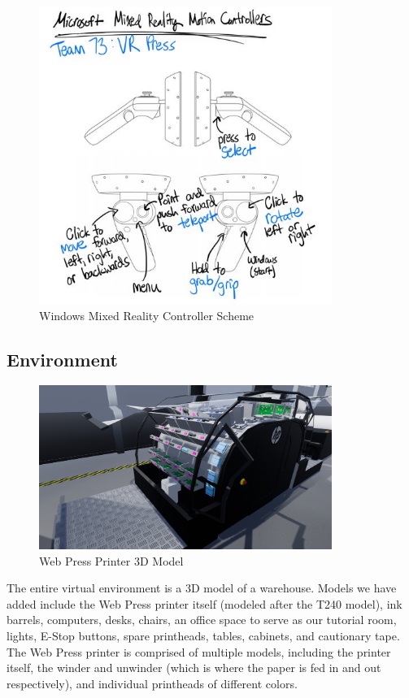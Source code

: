 \documentclass[onecolumn, draftclsnofoot,10pt, compsoc]{IEEEtran}
\begin{document}
\begin{figure}[ht!]
    \centering
    \includegraphics[width=0.85\textwidth]{VRPressInfographic.JPG}
    \caption{Windows Mixed Reality Controller Scheme}
    \label{fig:controllers}
\end{figure}


\subsection{Environment}

\begin{figure}[ht!]
    \centering
    \includegraphics[width=0.85\textwidth]{press1.png}
    \caption{Web Press Printer 3D Model}
    \label{fig:printerModel}
\end{figure}

The entire virtual environment is a 3D model of a warehouse. Models we have added include the Web Press printer itself (modeled after the T240 model), ink barrels, computers, desks, chairs, an office space to serve as our tutorial room, lights, E-Stop buttons, spare printheads, tables, cabinets, and cautionary tape. The Web Press printer is comprised of multiple models, including the printer itself, the winder and unwinder (which is where the paper is fed in and out respectively), and individual printheads of different colors. 
\end{document}
